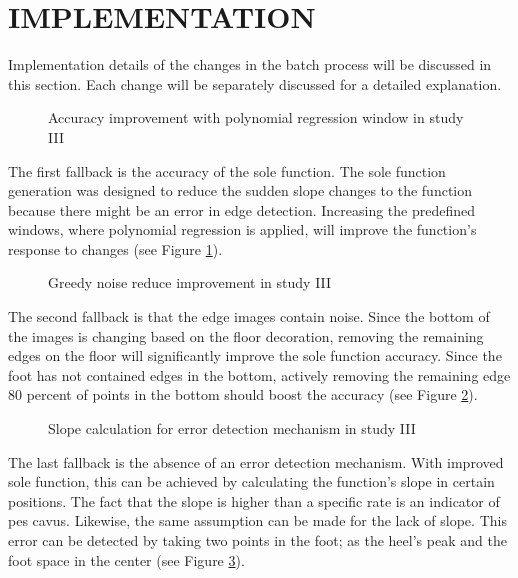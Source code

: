 \section{IMPLEMENTATION}\label{sec:StudyIIIImplementation}

Implementation details of the changes in the batch process will be discussed in this section. Each change will be separately discussed for a detailed explanation.

\begin{figure}[htbp]
\centering
{}
\caption{Accuracy improvement with polynomial regression window in study III}
\label{fig:StudyIIIPredefinedWindows}
\end{figure}

The first fallback is the accuracy of the sole function. The sole function generation was designed to reduce the sudden slope changes to the function because there might be an error in edge detection. Increasing the predefined windows, where polynomial regression is applied, will improve the function's response to changes (see Figure \ref{fig:StudyIIIPredefinedWindows}).

\begin{figure}[htbp]
\centering
{}
\caption{Greedy noise reduce improvement in study III}
\label{fig:StudyIIINoiseReduce}
\end{figure}

The second fallback is that the edge images contain noise. Since the bottom of the images is changing based on the floor decoration,  removing the remaining edges on the floor will significantly improve the sole function accuracy. Since the foot has not contained edges in the bottom, actively removing the remaining edge 80 percent of points in the bottom should boost the accuracy (see Figure \ref{fig:StudyIIINoiseReduce}).

\begin{figure}[htbp]
\centering
{}
\caption{Slope calculation for error detection mechanism  in study III}
\label{fig:StudyIIISlopeCalculation}
\end{figure}

The last fallback is the absence of an error detection mechanism. With improved sole function, this can be achieved by calculating the function's slope in certain positions. The fact that the slope is higher than a specific rate is an indicator of pes cavus. Likewise, the same assumption can be made for the lack of slope. This error can be detected by taking two points in the foot; as the heel's peak and the foot space in the center (see Figure \ref{fig:StudyIIISlopeCalculation}).

